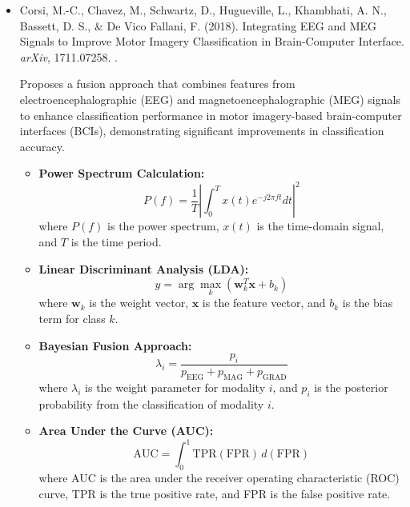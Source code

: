 \documentclass[10pt,svgnames,fragile]{beamer}
\begin{document}
\begin{frame}
\tiny
\begin{itemize}

    \item Corsi, M.-C., Chavez, M., Schwartz, D., Hugueville, L., Khambhati, A. N., Bassett, D. S., & De Vico Fallani, F. (2018). Integrating EEG and MEG Signals to Improve Motor Imagery Classification in Brain-Computer Interface. \textit{arXiv}, 1711.07258. \href{https://arxiv.org/abs/1711.07258}{\color{blue}{arXiv:1711.07258}}. \cite{corsiIntegratingEEGMEG2018}
    
    {\color{gray}Proposes a fusion approach that combines features from electroencephalographic (EEG) and magnetoencephalographic (MEG) signals to enhance classification performance in motor imagery-based brain-computer interfaces (BCIs), demonstrating significant improvements in classification accuracy.}
    \begin{itemize} \tiny
    \item \textbf{Power Spectrum Calculation:}
    \[
    P(f) = \frac{1}{T} \left| \int_{0}^{T} x(t) e^{-j2\pi ft} dt \right|^2
    \]
    where \( P(f) \) is the power spectrum, \( x(t) \) is the time-domain signal, and \( T \) is the time period.

    \item \textbf{Linear Discriminant Analysis (LDA):}
    \[
    y = \arg\max_k \left( \mathbf{w}_k^T \mathbf{x} + b_k \right)
    \]
    where \( \mathbf{w}_k \) is the weight vector, \( \mathbf{x} \) is the feature vector, and \( b_k \) is the bias term for class \( k \).

    \item \textbf{Bayesian Fusion Approach:}
    \[
    \lambda_i = \frac{p_i}{p_{\text{EEG}} + p_{\text{MAG}} + p_{\text{GRAD}}}
    \]
    where \( \lambda_i \) is the weight parameter for modality \( i \), and \( p_i \) is the posterior probability from the classification of modality \( i \).

    \item \textbf{Area Under the Curve (AUC):}
    \[
    \text{AUC} = \int_{0}^{1} \text{TPR}(\text{FPR}) \, d(\text{FPR})
    \]
    where AUC is the area under the receiver operating characteristic (ROC) curve, TPR is the true positive rate, and FPR is the false positive rate.
\end{itemize}










\end{itemize}
\end{frame}
\end{document}
